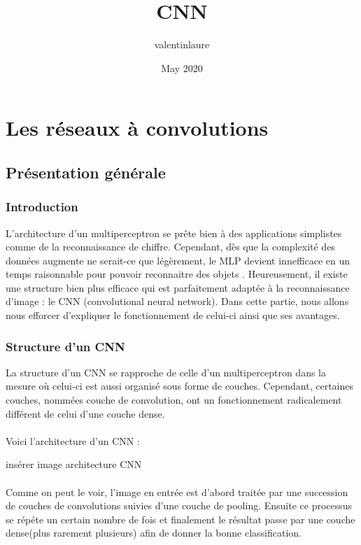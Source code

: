 \documentclass{article}
\title{CNN}
\author{valentinlaure }
\date{May 2020}
\begin{document}
\chapter{Les réseaux à convolutions}

\section{Présentation générale}

\subsection{Introduction}
L'architecture d'un multiperceptron se prête bien à des applications simplistes comme de la reconnaissance de chiffre. Cependant, dès que la complexité des données augmente ne serait-ce que légèrement, le MLP devient innefficace en un temps raisonnable pour pouvoir reconnaitre des objets . Heureusement, il existe une structure bien plus efficace qui est parfaitement adaptée à la reconnaissance d'image : le CNN (convolutional neural network). Dans cette partie, nous allons nous efforcer d'expliquer le fonctionnement de celui-ci ainsi que ses avantages. 

\subsection{Structure d'un CNN}
La structure d'un CNN se rapproche de celle d'un multiperceptron dans la mesure où celui-ci est aussi organisé sous forme de couches. Cependant, certaines couches, nommées couche de convolution, ont un fonctionnement radicalement différent de celui d'une couche dense. \\
\\
Voici l'architecture d'un CNN :

{insérer image architecture CNN}\\
\\
Comme on peut le voir, l'image en entrée est d'abord traitée par une succession de couches de convolutions suivies d'une couche de pooling. Ensuite ce processus se répéte un certain nombre de fois et finalement le résultat passe par une couche dense(plus rarement plusieurs) afin de donner la bonne classification.
\end{document}
